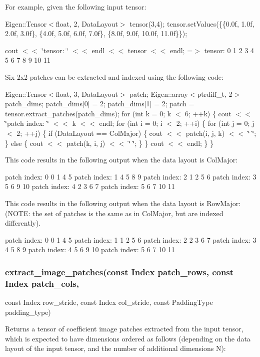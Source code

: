 For example, given the following input tensor\+:

Eigen\+::\+Tensor$<$float, 2, Data\+Layout$>$ tensor(3,4); tensor.\+set\+Values(\{\{0.\+0f, 1.\+0f, 2.\+0f, 3.\+0f\}, \{4.\+0f, 5.\+0f, 6.\+0f, 7.\+0f\}, \{8.\+0f, 9.\+0f, 10.\+0f, 11.\+0f\}\});

cout $<$$<$ \char`\"{}tensor\+: \char`\"{} $<$$<$ endl $<$$<$ tensor $<$$<$ endl; =$>$ tensor\+: 0 1 2 3 4 5 6 7 8 9 10 11

Six 2x2 patches can be extracted and indexed using the following code\+:

Eigen\+::\+Tensor$<$float, 3, Data\+Layout$>$ patch; Eigen\+::array$<$ptrdiff\+\_\+t, 2$>$ patch\+\_\+dims; patch\+\_\+dims\mbox{[}0\mbox{]} = 2; patch\+\_\+dims\mbox{[}1\mbox{]} = 2; patch = tensor.\+extract\+\_\+patches(patch\+\_\+dims); for (int k = 0; k $<$ 6; ++k) \{ cout $<$$<$ \char`\"{}patch index\+: \char`\"{} $<$$<$ k $<$$<$ endl; for (int i = 0; i $<$ 2; ++i) \{ for (int j = 0; j $<$ 2; ++j) \{ if (Data\+Layout == Col\+Major) \{ cout $<$$<$ patch(i, j, k) $<$$<$ \char`\"{} \char`\"{}; \} else \{ cout $<$$<$ patch(k, i, j) $<$$<$ \char`\"{} \char`\"{}; \} \} cout $<$$<$ endl; \} \}

This code results in the following output when the data layout is Col\+Major\+:

patch index\+: 0 0 1 4 5 patch index\+: 1 4 5 8 9 patch index\+: 2 1 2 5 6 patch index\+: 3 5 6 9 10 patch index\+: 4 2 3 6 7 patch index\+: 5 6 7 10 11

This code results in the following output when the data layout is Row\+Major\+: (N\+O\+TE\+: the set of patches is the same as in Col\+Major, but are indexed differently).

patch index\+: 0 0 1 4 5 patch index\+: 1 1 2 5 6 patch index\+: 2 2 3 6 7 patch index\+: 3 4 5 8 9 patch index\+: 4 5 6 9 10 patch index\+: 5 6 7 10 11

\subsubsection*{extract\+\_\+image\+\_\+patches(const Index patch\+\_\+rows, const Index patch\+\_\+cols,}

const Index row\+\_\+stride, const Index col\+\_\+stride, const Padding\+Type padding\+\_\+type)

Returns a tensor of coefficient image patches extracted from the input tensor, which is expected to have dimensions ordered as follows (depending on the data layout of the input tensor, and the number of additional dimensions \textquotesingle{}N\textquotesingle{})\+:

